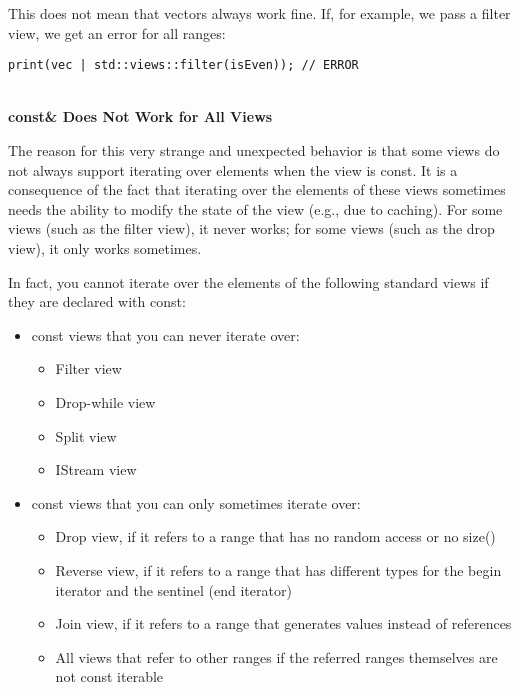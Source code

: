 This does not mean that vectors always work fine. If, for example, we pass a filter view, we get an error for all ranges:

\begin{lstlisting}[style=styleCXX]
print(vec | std::views::filter(isEven)); // ERROR
\end{lstlisting}


\noindent
\hspace*{\fill} \\ %
\textbf{const\& Does Not Work for All Views}

The reason for this very strange and unexpected behavior is that some views do not always support iterating over elements when the view is const. It is a consequence of the fact that iterating over the elements of these views sometimes needs the ability to modify the state of the view (e.g., due to caching). For some views (such as the filter view), it never works; for some views (such as the drop view), it only works sometimes.

In fact, you cannot iterate over the elements of the following standard views if they are declared with const:

\begin{itemize}
\item
const views that you can never iterate over:

\begin{itemize}
\item
Filter view

\item
Drop-while view

\item
Split view

\item
IStream view
\end{itemize}

\item
const views that you can only sometimes iterate over:

\begin{itemize}
\item
Drop view, if it refers to a range that has no random access or no size()

\item
Reverse view, if it refers to a range that has different types for the begin iterator and the sentinel (end iterator)

\item
Join view, if it refers to a range that generates values instead of references

\item
All views that refer to other ranges if the referred ranges themselves are not const iterable
\end{itemize}
\end{itemize}

